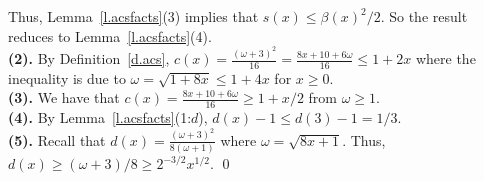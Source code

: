 \documentclass[letterpaper,11pt,oneside,reqno]{amsbook}
\numberwithin{figure}{chapter}
\theoremstyle{definition}
\theoremstyle{definition}
\theoremstyle{definition}
\theoremstyle{definition}
\theoremstyle{definition}
\newcommand{\macsee}{c}
\newcommand{\macbeta}{\beta}
\newcommand{\macomega}{\omega}
\newcommand{\macdee}{d}
\begin{document}
Thus, Lemma~\ref{l.acsfacts}(3) implies that  $s(x) \leq \macbeta(x)^2/2$. So the result reduces to Lemma~\ref{l.acsfacts}(4).  \\
{\bf (2).} By Definition~\ref{d.acs}, $\macsee(x) = \tfrac{(\macomega+3)^2}{16} =  \tfrac{8x+10+6\macomega}{16} \leq 1 + 2x$ where the inequality is due to $\macomega = \sqrt{1+ 8x} \leq 1+4x$ for $x \geq 0$. \\
{\bf (3).} We have that $\macsee(x) =  \tfrac{8x+10+6\macomega}{16} \geq 1 + x/2$ from $\macomega \geq 1$. \\
{\bf (4).} By Lemma~\ref{l.acsfacts}(1:$d$), $\macdee(x) -1 \leq \macdee(3) - 1 =  1/3$.\\
{\bf (5).} Recall that $\macdee(x) = \tfrac{(\macomega + 3)^2}{8(\macomega+1)}$ where $\macomega = \sqrt{8x+1}$. Thus, $\macdee(x) \geq (\macomega +3)/8 \geq 2^{-3/2}x^{1/2}$.  \qed
\end{document}
